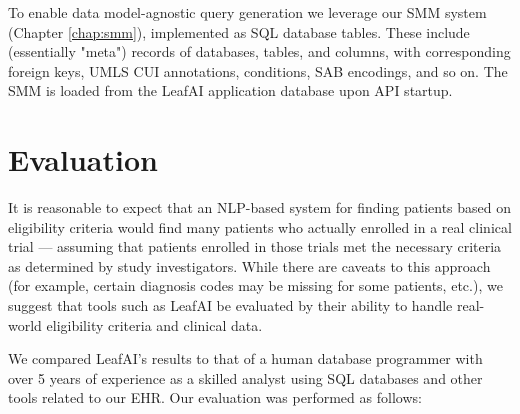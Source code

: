 \documentclass[../main.tex]{subfiles}
\begin{document}
To enable data model-agnostic query generation we leverage our SMM system (Chapter \ref{chap:smm}), implemented as SQL database tables. These include (essentially "meta") records of databases, tables, and columns, with corresponding foreign keys, UMLS CUI annotations, conditions, SAB encodings, and so on. The SMM is loaded from the LeafAI application database upon API startup.

\section{Evaluation}

It is reasonable to expect that an NLP-based system for finding patients based on eligibility criteria would find many  patients who actually enrolled in a real clinical trial — assuming  that patients enrolled in those trials met the necessary criteria as determined by study investigators. While there are caveats to this approach (for example, certain diagnosis codes may be missing for some patients, etc.), we suggest that tools such as LeafAI be evaluated by their ability to handle real-world eligibility criteria and clinical data. 

We compared LeafAI's results to that of a human database programmer with over 5 years of experience as a skilled analyst using SQL databases and other tools related to our EHR. Our evaluation was performed as follows:
\end{document}
